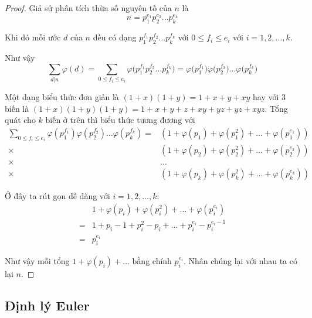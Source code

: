 \begin{proof}
    Giả sử phân tích thừa số nguyên tố của $n$ là 
    \begin{equation*}
        n = p_1^{e_1} p_2^{e_2} \ldots p_k^{e_k}
    \end{equation*}

    Khi đó mỗi ước $d$ của $n$ đều có dạng $p_1^{f_1} p_2^{f_2} \ldots p_k^{f_k}$ với $0 \leqslant f_i \leqslant e_i$ với $i = 1, 2, \ldots, k$.

    Như vậy
    \begin{equation*}
        \sum_{d | n} \varphi(d) = \sum_{0 \leqslant f_i \leqslant e_i} \varphi\Big(p_1^{f_1} p_2^{f_2} \ldots p_k^{f_k}\Big)
                            = \varphi\Big(p_1^{f_1}\Big) \varphi\Big(p_2^{f_2}\Big) \ldots \varphi\Big(p_k^{f_k}\Big)
    \end{equation*}

    Một dạng biểu thức đơn giản là $(1+x)(1+y) = 1+x+y+xy$ hay với 3 biến là $(1+x)(1+y)(1+y) = 1 + x + y + z + xy + yz + yz + xyz$. Tổng quát cho $k$ biến ở trên thì biểu thức tương đương với
    \begin{align*}
        \sum_{0 \leqslant f_i \leqslant e_i} \varphi(p_1^{f_1}) \varphi(p_2^{f_2}) \ldots
        \varphi(p_k^{f_k}) = & (1 + \varphi(p_1) + \varphi(p_1^2) + \ldots + \varphi(p_1^{e_1})) \\
        \times & (1 + \varphi(p_2) + \varphi(p_2^2) + \ldots + \varphi(p_2^{e_2})) \\
        \times & \ldots \\
        \times & (1 + \varphi(p_k) + \varphi(p_k^2) + \ldots + \varphi(p_k^{e_k}))
    \end{align*}

    Ở đây ta rút gọn dễ dàng với $i = 1, 2, \ldots, k$:
    \begin{align*}
        & 1 + \varphi(p_i) + \varphi(p_i^2) + \ldots + \varphi(p_i^{e_i}) \\
        = & 1 + p_i - 1 + p_i^2 - p_i + \ldots + p_i^{e_i} - p_i^{e_i-1} \\
        = & p_i^{e_i}
    \end{align*}

    Như vậy mỗi tổng $1 + \varphi(p_i) + \ldots$ bằng chính $p_i^{e_i}$. Nhân chúng lại với nhau ta có lại $n$.
\end{proof}

\subsection*{Định lý Euler}

